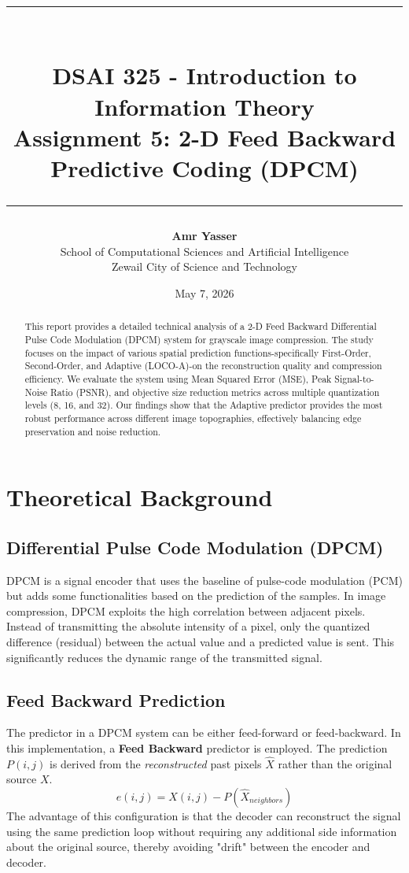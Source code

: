 \documentclass[12pt,a4paper]{article}
\title{
    \vspace{-2cm}
    \rule{\linewidth}{1pt} \\ [0.4cm]
    \large \textbf{DSAI 325 - Introduction to Information Theory} \\ [0.2cm]
    \Large \textbf{Assignment 5: 2-D Feed Backward Predictive Coding (DPCM)} \\ [0.2cm]
    \rule{\linewidth}{1pt}
}
\author{\textbf{Amr Yasser} \\ School of Computational Sciences and Artificial Intelligence \\ Zewail City of Science and Technology}
\date{May 7, 2026}
\begin{document}
\maketitle

\begin{abstract}
This report provides a detailed technical analysis of a 2-D Feed Backward Differential Pulse Code Modulation (DPCM) system for grayscale image compression. The study focuses on the impact of various spatial prediction functions-specifically First-Order, Second-Order, and Adaptive (LOCO-A)-on the reconstruction quality and compression efficiency. We evaluate the system using Mean Squared Error (MSE), Peak Signal-to-Noise Ratio (PSNR), and objective size reduction metrics across multiple quantization levels (8, 16, and 32). Our findings show that the Adaptive predictor provides the most robust performance across different image topographies, effectively balancing edge preservation and noise reduction.
\end{abstract}

\tableofcontents
\newpage

\section{Theoretical Background}

\subsection{Differential Pulse Code Modulation (DPCM)}

DPCM is a signal encoder that uses the baseline of pulse-code modulation (PCM) but adds some functionalities based on the prediction of the samples. In image compression, DPCM exploits the high correlation between adjacent pixels. Instead of transmitting the absolute intensity of a pixel, only the quantized difference (residual) between the actual value and a predicted value is sent. This significantly reduces the dynamic range of the transmitted signal.

\subsection{Feed Backward Prediction}

The predictor in a DPCM system can be either feed-forward or feed-backward. In this implementation, a \textbf{Feed Backward} predictor is employed. The prediction $P(i,j)$ is derived from the \textit{reconstructed} past pixels $\hat{X}$ rather than the original source $X$. 
\[ e(i,j) = X(i,j) - P(\hat{X}_{neighbors}) \]
The advantage of this configuration is that the decoder can reconstruct the signal using the same prediction loop without requiring any additional side information about the original source, thereby avoiding "drift" between the encoder and decoder.
\end{document}

